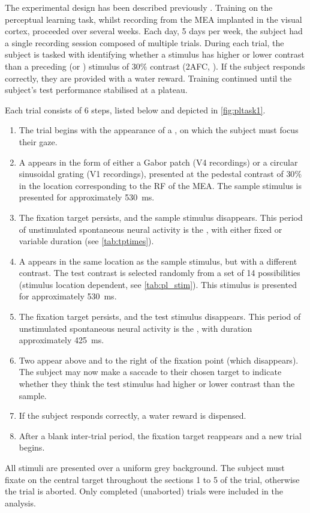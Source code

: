 The experimental design has been described previously \citep[see][]{Chen2013}.
Training on the perceptual learning task, whilst recording from the \ac{MEA} implanted in the visual cortex, proceeded over several weeks.
Each day, 5 days per week, the subject had a single recording session composed of multiple trials.
During each trial, the subject is tasked with identifying whether a  stimulus has higher or lower contrast than a preceding  (or ) stimulus of $30\%$ contrast (\acl{2AFC}, ).
If the subject responds correctly, they are provided with a water reward.
Training continued until the subject's test performance stabilised at a plateau.

Each trial consists of 6 steps, listed below and depicted in \autoref{fig:pltask1}.
\begin{enumerate}
\item The trial begins with the appearance of a , on which the subject must focus their gaze.
\item A  appears in the form of either a Gabor patch (\ac{V4} recordings) or a circular sinusoidal grating (\ac{V1} recordings), presented at the pedestal contrast of $30\%$ in the location corresponding to the \ac{RF} of the \ac{MEA}.
The sample stimulus is presented for approximately \SI{530}{\milli\second}.
\item The fixation target persists, and the sample stimulus disappears.
This period of unstimulated spontaneous neural activity is the , with either fixed or variable duration (see \autoref{tab:tptimes}).
\item A  appears in the same location as the sample stimulus, but with a different contrast.
The test contrast is selected randomly from a set of \num{14} possibilities (stimulus location dependent, see \autoref{tab:pl_stim}).
This stimulus is presented for approximately \SI{530}{\milli\second}.
\item The fixation target persists, and the test stimulus disappears.
This period of unstimulated spontaneous neural activity is the , with duration approximately \SI{425}{\milli\second}.
\item Two  appear above and to the right of the fixation point (which disappears).
The subject may now make a saccade to their chosen target to indicate whether they think the test stimulus had higher or lower contrast than the sample.
\item If the subject responds correctly, a water reward is dispensed.
\item After a blank inter-trial period, the fixation target reappears and a new trial begins.
\end{enumerate}
All stimuli are presented over a uniform grey background.
The subject must fixate on the central target throughout the sections 1 to 5 of the trial, otherwise the trial is aborted.
Only completed (unaborted) trials were included in the analysis.


